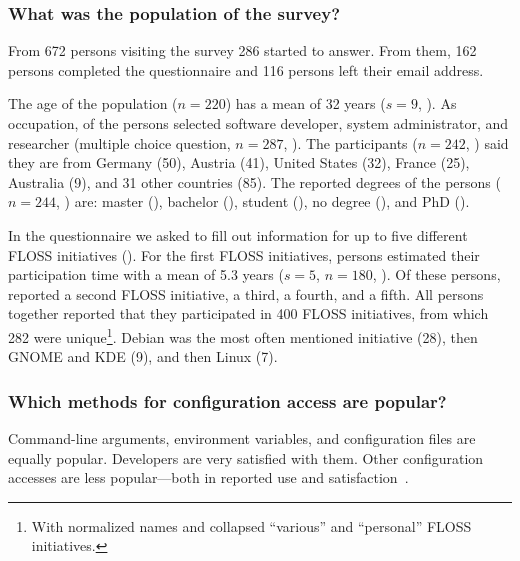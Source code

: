 \subsubsection{What was the population of the survey?}

\methodQuestion{}
From 672 persons visiting the survey 286 started to answer.
From them, 162 persons completed the questionnaire and 116 persons left their email address.

The age of the population ($n=220$) has a mean of 32 years ($s=9$, ).
As occupation,  of the persons selected software developer,  system administrator, and  researcher (multiple choice question, $n=287$, ).
The participants ($n=242$, ) said they are from Germany (50), Austria (41), United States (32), France (25), Australia (9), and 31 other countries (85).
The reported degrees of the persons ($n=244$, ) are: master (), bachelor (), student (), no degree (), and PhD ().

In the questionnaire we asked to fill out information for up to five different FLOSS initiatives ().
For the first FLOSS initiatives, persons estimated their participation time with a mean of 5.3 years ($s=5$, $n=180$, ).
Of these persons,  reported a second FLOSS initiative,  a third,  a fourth, and  a fifth.
All persons together reported that they participated in 400 FLOSS initiatives, from which 282 were unique\footnote{With normalized names and collapsed ``various'' and ``personal'' FLOSS initiatives.}.
Debian was the most often mentioned initiative (28), then GNOME and KDE (9), and then Linux (7).



\subsubsection{Which methods for configuration access are popular?}
\label{survey}

\begin{finding}
Command-line arguments, environment variables, and configuration files are equally popular.
Developers are very satisfied with them.
Other configuration accesses are less popular---both in reported use and satisfaction~\cite{raab2017challenges}.
\end{finding}

